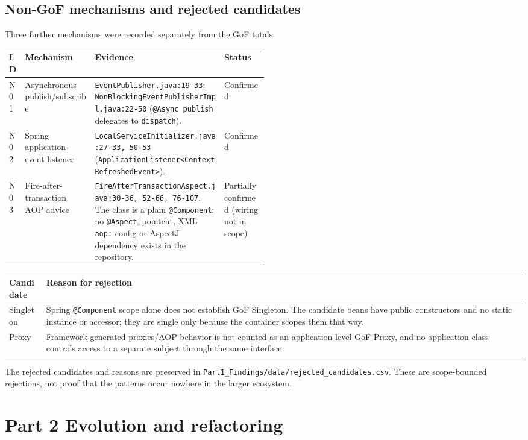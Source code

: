 \documentclass[11pt,a4paper]{article}
\newcommand{\code}[1]{\nolinkurl{#1}}
\begin{document}
\subsection{Non-GoF mechanisms and rejected candidates}
Three further mechanisms were recorded separately from the GoF totals:

\begin{tabularx}{\linewidth}{@{}P{0.06\linewidth}P{0.27\linewidth}YP{0.17\linewidth}@{}}
\toprule
ID & Mechanism & Evidence & Status\\
\midrule
N01 & Asynchronous publish/subscribe & \code{EventPublisher.java:19-33}; \code{NonBlockingEventPublisherImpl.java:22-50} (\code{@Async publish} delegates to \code{dispatch}). & Confirmed\\
N02 & Spring application-event listener & \code{LocalServiceInitializer.java:27-33, 50-53} (\code{ApplicationListener<ContextRefreshedEvent>}). & Confirmed\\
N03 & Fire-after-transaction AOP advice & \code{FireAfterTransactionAspect.java:30-36, 52-66, 76-107}. The class is a plain \code{@Component}; no \code{@Aspect}, pointcut, XML \code{aop:} config or AspectJ dependency exists in the repository. & Partially confirmed (wiring not in scope)\\
\bottomrule
\end{tabularx}

\begin{tabularx}{\linewidth}{@{}lY@{}}
\toprule
Candidate & Reason for rejection\\
\midrule
Singleton & Spring \code{@Component} scope alone does not establish GoF Singleton. The candidate beans have public constructors and no static instance or accessor; they are single only because the container scopes them that way.\\
Proxy & Framework-generated proxies/AOP behavior is not counted as an application-level GoF Proxy, and no application class controls access to a separate subject through the same interface.\\
\bottomrule
\end{tabularx}
The rejected candidates and reasons are preserved in \code{Part1_Findings/data/rejected_candidates.csv}. These are scope-bounded rejections, not proof that the patterns occur nowhere in the larger ecosystem.

\section{Part 2 Evolution and refactoring}
\end{document}
